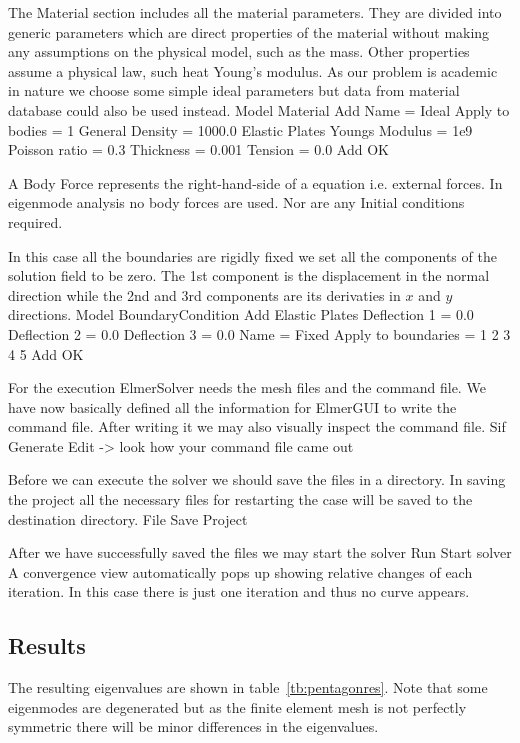 The Material section includes all the material parameters.
They are divided into generic parameters which are direct properties of the material
without making any assumptions on the physical model, such as the mass. Other properties assume
a physical law, such heat Young's modulus. As our problem is academic in nature we choose some 
simple ideal parameters but data from material database could also be used instead.
\ttbegin
Model
  Material
    Add 
      Name = Ideal
      Apply to bodies = 1 
      General    
        Density = 1000.0
      Elastic Plates
        Youngs Modulus = 1e9
        Poisson ratio = 0.3
        Thickness = 0.001
        Tension = 0.0	
      Add
      OK
\ttend

A Body Force represents the right-hand-side of a equation i.e. external forces. In eigenmode analysis
no body forces are used. Nor are any Initial conditions required.

In this case all the boundaries are rigidly fixed we set all the components of the 
solution field to be zero. The 1st component is the displacement in the normal direction
while the 2nd and 3rd components are its derivaties in $x$ and $y$ directions.
\ttbegin
Model
  BoundaryCondition
    Add 
      Elastic Plates
        Deflection 1 = 0.0
        Deflection 2 = 0.0
        Deflection 3 = 0.0
      Name = Fixed
      Apply to boundaries = 1 2 3 4 5
      Add
      OK
\ttend   

For the execution 
ElmerSolver needs the mesh files and the command file. We have now basically defined
all the information for ElmerGUI to write the command file. After writing it we may also visually 
inspect the command file.
\ttbegin
Sif 
  Generate
  Edit -> look how your command file came out  
\ttend

Before we can execute the solver we should save the files in a directory. In saving the project all the
necessary files for restarting the case will be saved to the 
destination directory.
\ttbegin
File 
  Save Project
\ttend

After we have successfully saved the files we may start the solver
\ttbegin
Run
  Start solver
\ttend
A convergence view automatically pops up showing relative changes of each iteration.
In this case there is just one iteration and thus no curve appears.

\subsection*{Results}
The resulting eigenvalues are shown in table~\ref{tb:pentagonres}.
Note that some eigenmodes are degenerated but as the finite element mesh is not
perfectly symmetric there will be minor differences in the eigenvalues.

